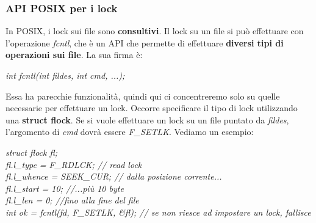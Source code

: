 \documentclass[12pt]{article}
\begin{document}
\subsubsection{API POSIX per i lock}
In POSIX, i lock sui file sono \textbf{consultivi}. Il lock su un file si può effettuare con l'operazione \textit{fcntl}, che è un API che permette di effettuare \textbf{diversi tipi di operazioni sui file}. La sua firma è:
\begin{center}
    \textit{int fcntl(int fildes, int cmd, ...);}
\end{center}
Essa ha parecchie funzionalità, quindi qui ci concentreremo solo su quelle necessarie per effettuare un lock.
Occorre specificare il tipo di lock utilizzando una \textbf{struct flock}. Se si vuole effettuare un lock su un file puntato da \textit{fildes}, l'argomento di \textit{cmd} dovrà essere
\textit{F\_SETLK}. Vediamo un esempio:
\begin{center}
    \textit{struct flock fl;} \\
    \textit{fl.l\_type = F\_RDLCK; // read lock} \\
    \textit{fl.l\_whence = SEEK\_CUR; // dalla posizione corrente...} \\
    \textit{fl.l\_start = 10; //...più 10 byte} \\
    \textit{fl.l\_len = 0; //fino alla fine del file} \\
    \textit{int ok = fcntl(fd, F\_SETLK, \textnormal{\&}fl); // se non riesce ad impostare un lock, fallisce}
\end{center}
\end{document}
